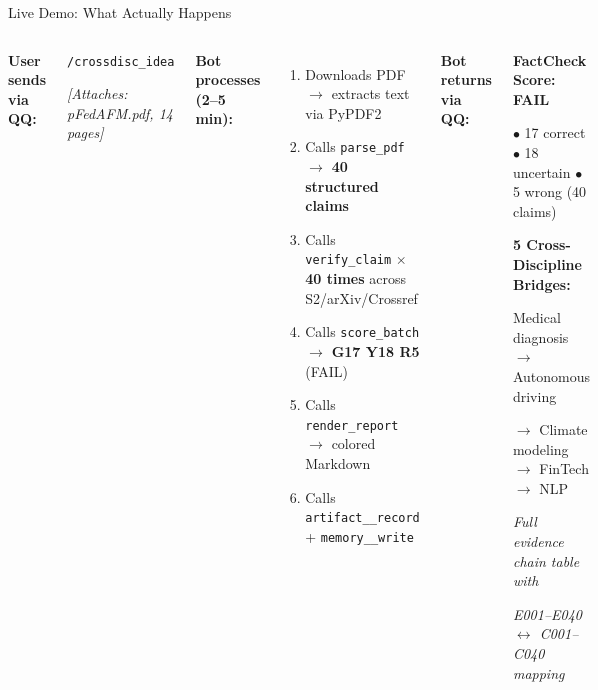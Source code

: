 \documentclass[aspectratio=169,11pt]{beamer}
\begin{document}
\begin{frame}{Live Demo: What Actually Happens}
  \begin{columns}[T]
    \textbf{User sends via QQ:}
    \begin{block}{}
      \footnotesize
      \texttt{/crossdisc\_idea}

      \smallskip
      \textit{[Attaches: pFedAFM.pdf, 14 pages]}
    \end{block}

    \vspace{0.2cm}
    \textbf{Bot processes (2--5 min):}
    \begin{enumerate}
      \footnotesize
      \item Downloads PDF $\to$ extracts text via PyPDF2
      \item Calls \texttt{parse\_pdf} $\to$ \textbf{40 structured claims}
      \item Calls \texttt{verify\_claim} $\times$\textbf{40 times} across S2/arXiv/Crossref
      \item Calls \texttt{score\_batch} $\to$ \textbf{G17 Y18 R5} (FAIL)
      \item Calls \texttt{render\_report} $\to$ colored Markdown
      \item Calls \texttt{artifact\_\_record} + \texttt{memory\_\_write}
    \end{enumerate}

    \textbf{Bot returns via QQ:}
    \begin{block}{}
      \footnotesize
      \textbf{FactCheck Score: FAIL}

      \textcolor{greenRYG}{$\bullet$} 17 correct \quad
      \textcolor{yellowRYG}{$\bullet$} 18 uncertain \quad
      \textcolor{redRYG}{$\bullet$} 5 wrong (40 claims)

      \smallskip
      \textbf{5 Cross-Discipline Bridges:}

      Medical diagnosis $\to$ Autonomous driving

      $\to$ Climate modeling $\to$ FinTech $\to$ NLP

      \smallskip
      \textit{Full evidence chain table with}

      \textit{E001–E040 $\leftrightarrow$ C001–C040 mapping}
    \end{block}
  \end{columns}
\end{frame}
\end{document}
